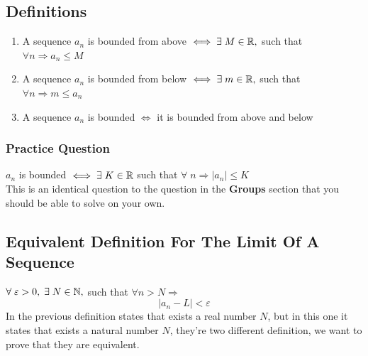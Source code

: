 \subsection{Definitions}
\begin{enumerate}
    \item A sequence $a_n$ is bounded from above $\iff \exists\; M\in \mathbb{R},$ such that $\forall n\Longrightarrow a_n\leq M$
    \item A sequence $a_n$ is bounded from below $\iff \exists\; m\in \mathbb{R},$ such that $\forall n\Longrightarrow m\leq a_n$
    \item A sequence $a_n$ is bounded $\iff$ it is bounded from above and below
\end{enumerate}

\subsubsection{Practice Question}
$a_n$ is bounded $\iff \exists\; K\in \mathbb{R}$ such that $\forall\; n \Longrightarrow |a_n|\leq K$\\
This is an identical question to the question in the \textbf{Groups} section that you should be able to solve on your own.\\

\subsection{Equivalent Definition For The Limit Of A Sequence}
$\forall\; \varepsilon>0,\; \exists\; N\in \mathbb{N},$ such that $\forall n>N \Longrightarrow$
\[
    |a_n-L|<\varepsilon
\]
In the previous definition states that exists a real number $N$, but in this one it states that exists a natural number $N$, they're two different definition, we want to prove that they are equivalent.\\
